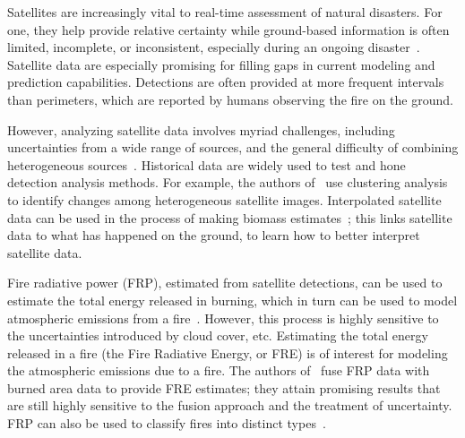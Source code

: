 Satellites are increasingly vital to real-time assessment of natural disasters. For one, they help provide relative certainty while ground-based information is often limited, incomplete, or inconsistent, especially during an ongoing disaster~\cite{Voigt2016}. Satellite data are especially promising for filling gaps in current modeling and prediction capabilities. Detections are often provided at more frequent intervals than perimeters, which are reported by humans observing the fire on the ground. 

% 

However, analyzing satellite data involves myriad challenges, including uncertainties from a wide range of sources, and the general difficulty of combining heterogeneous sources~\cite{Luppino2017}. Historical data are widely used to test and hone detection analysis methods. For example, the authors of~\cite{Luppino2017} use clustering analysis to identify changes among heterogeneous satellite images. Interpolated satellite data can be used in the process of making biomass estimates~\cite{Zhang2011}; this links satellite data to what has happened on the ground, to learn how to better interpret satellite data.



Fire radiative power (FRP), estimated from satellite detections, can be used to estimate the total energy released in burning, which in turn can be used to model atmospheric emissions from a fire~\cite{Boschetti2009}. However, this process is highly sensitive to the uncertainties introduced by cloud cover, etc. Estimating the total energy released in a fire (the Fire Radiative Energy, or FRE) is of interest for modeling the atmospheric emissions due to a fire. The authors of~\cite{Boschetti2009} fuse FRP data with burned area data to provide FRE estimates; they attain promising results that are still highly sensitive to the fusion approach and the treatment of uncertainty. FRP can also be used to classify fires into distinct types~\cite{Smith2005}.

